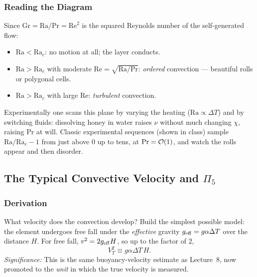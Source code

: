 \subsubsection*{Reading the Diagram}
Since $\mathrm{Gr}=\mathrm{Ra}/\mathrm{Pr}=\mathrm{Re}^2$ is the squared
Reynolds number of the self-generated flow:
\begin{itemize}
    \item $\mathrm{Ra}<\mathrm{Ra}_c$: no motion at all; the layer conducts.
    \item $\mathrm{Ra}>\mathrm{Ra}_c$ with moderate
    $\mathrm{Re}=\sqrt{\mathrm{Ra}/\mathrm{Pr}}$: \emph{ordered} convection
    --- beautiful rolls or polygonal cells.
    \item $\mathrm{Ra}>\mathrm{Ra}_c$ with large $\mathrm{Re}$:
    \emph{turbulent} convection.
\end{itemize}
Experimentally one scans this plane by varying the heating
($\mathrm{Ra}\propto\Delta T$) and by switching fluids: dissolving honey in
water raises $\nu$ without much changing $\chi$, raising $\mathrm{Pr}$ at
will. Classic experimental sequences (shown in class) sample
$\mathrm{Ra}/\mathrm{Ra}_c-1$ from just above $0$ up to tens, at
$\mathrm{Pr}=\order{1}$, and watch the rolls appear and then disorder.


\subsection{The Typical Convective Velocity and \texorpdfstring{$\Pi_5$}{Pi5}}
\label{sec:lec09:typical-velocity}

\subsubsection*{Derivation}
What velocity does the convection develop? Build the simplest possible model:
the element undergoes free fall under the \emph{effective} gravity
$g_{\rm eff}=g\alpha\Delta T$ over the distance $H$. For free fall,
$v^2=2g_{\rm eff}H$, so up to the factor of $2$,
\begin{equation}
    \boxed{
    V_T^2\equiv g\alpha\Delta T\,H.
    }
    \label{eq:lec09:vtypical}
\end{equation}
\textit{Significance:} This is the same buoyancy-velocity estimate as
Lecture~8, now promoted to the \emph{unit} in which the true velocity is
measured.

